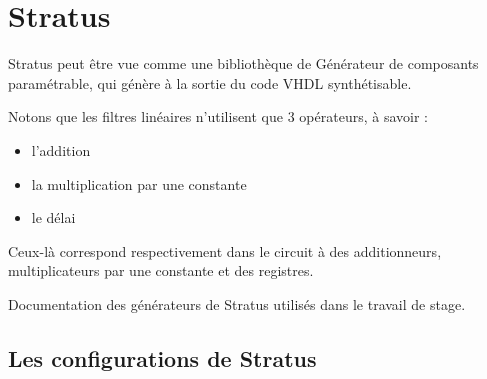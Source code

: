 \chapter{Stratus}
Stratus peut être vue comme une bibliothèque de Générateur de composants paramétrable, qui génère à la sortie du code VHDL synthétisable.

Notons que les filtres linéaires n'utilisent que 3 opérateurs, à savoir :
\begin{itemize}
\item l'addition
\item la multiplication par une constante
\item le délai
\end{itemize}

\smallskip
Ceux-là correspond respectivement dans le circuit à des additionneurs, multiplicateurs par une constante et des registres.

\bigskip
Documentation des générateurs de Stratus utilisés dans le travail de stage. 

\section{Les configurations de Stratus}
